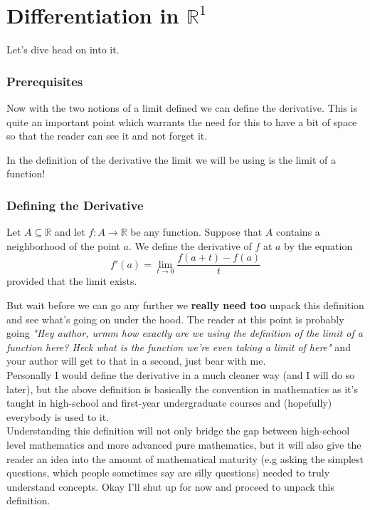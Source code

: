 	\chapter{Differentiation in $\mathbb{R}^1$}
	Let's dive head on into it.
	\subsection{Prerequisites}
	
	
	Now with the two notions of a limit defined we can define the derivative. This is quite an important point which warrants the need for this to have a bit of space so that the reader can see it and not forget it.
	\medskip
	\begin{point}
		In the definition of the derivative the limit we will be using is the limit of a function!
	\end{point}
	
	\subsection{Defining the Derivative}
	
	
	\begin{definition}
		Let $A \subseteq \mathbb{R}$ and let $f : A \to \mathbb{R}$ be any function. Suppose that $A$ contains a neighborhood of the point $a$. We define the derivative of $f$ at $a$ by the equation $$f'(a) = \lim_{t \to 0} \frac{f(a+t) - f(a)}{t}$$ provided that the limit exists.
	\end{definition}
	
	But wait before we can go any further we \textbf{really need too} unpack this definition and see what's going on under the hood. The reader at this point is probably going \textit{"Hey author, urmm how exactly are we using the definition of the limit of a function here? Heck what is the function we're even taking a limit of here"} and your author will get to that in a second, just bear with me. \\
		
	Personally I would define the derivative in a much cleaner way (and I will do so later), but the above definition is basically the convention in mathematics as it's taught in high-school and first-year undergraduate courses and (hopefully) everybody is used to it. \\
		
	Understanding this definition will not only bridge the gap between high-school level mathematics and more advanced pure mathematics, but it will also give the reader an idea into the amount of mathematical maturity (e.g asking the simplest questions, which people sometimes say are silly questions) needed to truly understand concepts. Okay I'll shut up for now and proceed to unpack this definition. \\
	
